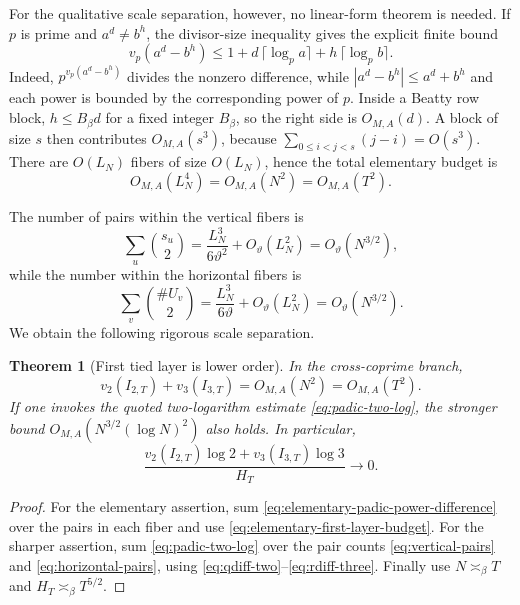 \documentclass[11pt,oneside]{article}
\newtheorem{theorem}{Theorem}[section]
\theoremstyle{definition}
\theoremstyle{remark}
\begin{document}
For the qualitative scale separation, however, no linear-form theorem is needed.  If $p$ is
prime and $a^d\ne b^h$, the divisor-size inequality gives the explicit finite bound
\begin{equation}
 v_p(a^d-b^h)
 \le 1+d\,\lceil\log_p a\rceil+h\,\lceil\log_p b\rceil.
 \label{eq:elementary-padic-power-difference}
\end{equation}
Indeed, $p^{v_p(a^d-b^h)}$ divides the nonzero difference, while
$|a^d-b^h|\le a^d+b^h$ and each power is bounded by the corresponding power of $p$.
Inside a Beatty row block, $h\le B_{\beta}d$ for a fixed integer $B_\beta$, so the right side
is $O_{M,A}(d)$.  A block of size $s$ then contributes $O_{M,A}(s^3)$, because
$\sum_{0\le i<j<s}(j-i)=O(s^3)$.  There are $O(L_N)$ fibers of size $O(L_N)$, hence the
total elementary budget is
\begin{equation}
 O_{M,A}(L_N^4)=O_{M,A}(N^2)=O_{M,A}(T^2).
 \label{eq:elementary-first-layer-budget}
\end{equation}

The number of pairs within the vertical fibers is
\begin{equation}\label{eq:vertical-pairs}
 \sum_u\binom{s_u}{2}
 =\frac{L_N^3}{6\vartheta^2}+O_\vartheta(L_N^2)
 =O_\vartheta(N^{3/2}),
\end{equation}
while the number within the horizontal fibers is
\begin{equation}\label{eq:horizontal-pairs}
 \sum_v\binom{\#U_v}{2}
 =\frac{L_N^3}{6\vartheta}+O_\vartheta(L_N^2)
 =O_\vartheta(N^{3/2}).
\end{equation}
We obtain the following rigorous scale separation.

\begin{theorem}[First tied layer is lower order]\label{thm:first-layer-small}
In the cross-coprime branch,
\begin{equation}\label{eq:first-layer-small}
 v_2(I_{2,T})+v_3(I_{3,T})
 =O_{M,A}(N^2)=O_{M,A}(T^2).
\end{equation}
If one invokes the quoted two-logarithm estimate \eqref{eq:padic-two-log}, the stronger bound
$O_{M,A}(N^{3/2}(\log N)^2)$ also holds.
In particular,
\begin{equation}\label{eq:first-layer-negligible}
 \frac{v_2(I_{2,T})\log2+v_3(I_{3,T})\log3}{H_T}
 \longrightarrow0.
\end{equation}
\end{theorem}

\begin{proof}
For the elementary assertion, sum \eqref{eq:elementary-padic-power-difference} over the pairs
in each fiber and use \eqref{eq:elementary-first-layer-budget}.  For the sharper assertion,
sum \eqref{eq:padic-two-log} over the pair counts
\eqref{eq:vertical-pairs} and \eqref{eq:horizontal-pairs}, using
\eqref{eq:qdiff-two}--\eqref{eq:rdiff-three}.  Finally use $N\asymp_\beta T$ and
$H_T\asymp_\beta T^{5/2}$.
\end{proof}
\end{document}
